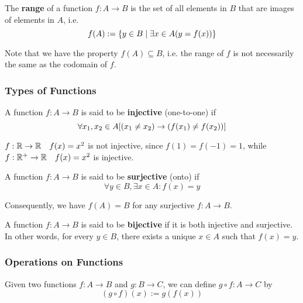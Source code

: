 \begin{definition}[Range]
    The \textbf{range} of a function $f:A\to B$ is the set of all elements in $B$ that
    are images of elements in $A$, i.e.
    \[
        f(A) := \{y\in B \mid \exists x\in A (y=f(x))\}
    \]

    Note that we have the property $f(A) \subseteq B$, i.e. the range of $f$ is not necessarily
    the same as the codomain of $f$.
\end{definition}

\subsubsection{Types of Functions}

\begin{definition}
    A function $f:A\to B$ is said to be \textbf{injective} (one-to-one) if
    \[
        \forall x_1, x_2 \in A [(x_1  \neq x_2) \rightarrow (f(x_1) \neq f(x_2))]
    \]
\end{definition}

\begin{example}
    $f:\mathbb{R}\to\mathbb{R}\quad f(x) = x^2$ is not injective, since $f(1) = f(-1) = 1$,
    while $f:\mathbb{R}^+\to\mathbb{R}\quad f(x) = x^2$ is injective.
\end{example}

\begin{definition}
    A function $f:A\to B$ is said to be \textbf{surjective} (onto) if
    \[
        \forall y \in B, \exists x \in A : f(x) = y
    \]

    Consequently, we have $f(A) = B$ for any surjective $f:A\to B$.
\end{definition}

\begin{definition}
    A function $f:A\to B$ is said to be \textbf{bijective} if it is both injective and surjective.
    In other words, for every $y \in B$, there exists a unique $x \in A$ such that $f(x) = y$.
\end{definition}

\subsubsection{Operations on Functions}

\begin{definition}
    Given two functions $f:A\to B$ and $g:B\to C$, we can define $g\circ f:A\to C$ by
    \[
        (g\circ f)(x) := g(f(x))
    \]
\end{definition}

